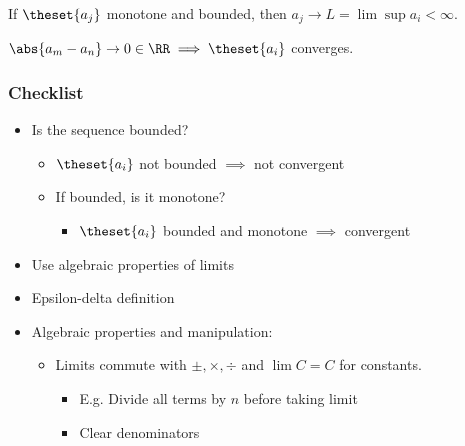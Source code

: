 \begin{theorem}

If \(\theset{a_j}\) monotone and bounded, then
\(a_j \to L = \lim\sup a_i < \infty\).

\end{theorem}

\begin{theorem}

\(\abs{a_m - a_n} \to 0 \in \RR \implies \theset{a_i}\) converges.

\end{theorem}

\hypertarget{checklist}{%
\subsubsection{Checklist}\label{checklist}}

\begin{itemize}
\item
  Is the sequence bounded?

  \begin{itemize}
  \tightlist
  \item
    \(\theset{a_i}\) not bounded \(\implies\) not convergent
  \item
    If bounded, is it monotone?

    \begin{itemize}
    \tightlist
    \item
      \(\theset{a_i}\) bounded and monotone \(\implies\) convergent
    \end{itemize}
  \end{itemize}
\item
  Use algebraic properties of limits
\item
  Epsilon-delta definition
\item
  Algebraic properties and manipulation:

  \begin{itemize}
  \item
    Limits commute with \(\pm, \times, \div\) and \(\lim C = C\) for
    constants.

    \begin{itemize}
    \item
      E.g. Divide all terms by \(n\) before taking limit
    \item
      Clear denominators
    \end{itemize}
  \end{itemize}
\end{itemize}

